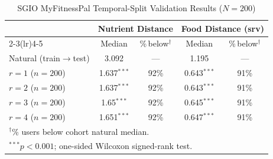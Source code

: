 \begin{table}[t]
\caption{SGIO MyFitnessPal Temporal-Split Validation Results ($N=200$)}
\label{tab:mfp_results}
\begin{center}
\begin{tabular}{lcccc}
\toprule
 & \multicolumn{2}{c}{\textbf{Nutrient Distance}}
 & \multicolumn{2}{c}{\textbf{Food Distance (srv)}} \\
\cmidrule(lr){2-3}\cmidrule(lr){4-5}
 & Median & \%\,below$^{\dagger}$ & Median & \%\,below$^{\dagger}$ \\
\midrule
Natural (train$\to$test) & 3.092 & --- & 1.195 & --- \\
\midrule
$r{=}1$ ($n{=}200$) & 1.637$^{***}$ & 92\% & 0.643$^{***}$ & 91\% \\
$r{=}2$ ($n{=}200$) & 1.637$^{***}$ & 92\% & 0.643$^{***}$ & 91\% \\
$r{=}3$ ($n{=}200$) & 1.65$^{***}$ & 92\% & 0.645$^{***}$ & 91\% \\
$r{=}4$ ($n{=}200$) & 1.651$^{***}$ & 92\% & 0.647$^{***}$ & 91\% \\
\bottomrule
\multicolumn{5}{l}{%
  \footnotesize $^{\dagger}$\% users below cohort natural median.}\\
\multicolumn{5}{l}{%
  \footnotesize $^{***}p{<}0.001$; one-sided Wilcoxon signed-rank test.}
\end{tabular}
\end{center}
\end{table}